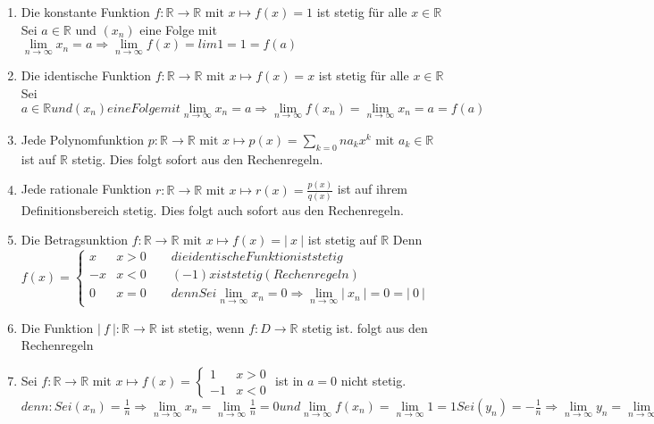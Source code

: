 \documentclass[a4paper,titlepage,oneside]{article}
\def\R{\ensuremath{\mathbb{R}} }
\renewcommand{\liminf}[2][n]{\ensuremath{\lim\limits_{#1 \rightarrow \infty}{#2}}}
\newcommand{\abs}[1]{\ensuremath{\left|\:#1\:\right|}}
\theoremstyle{thmstyle}
\begin{document}
\begin{bsp}
\begin{enumerate}
\item Die konstante Funktion $ f : \R \to \R \text{ mit } x \mapsto f(x) = 1 $ ist stetig für alle $x \in \R$
Sei $a \in \R$ und $(x_n)$ eine Folge mit $\liminf{x_n} = a \Rightarrow \liminf{f(x)} = lim 1 = 1 = f(a)$

\item Die identische Funktion $f : \R \to \R \text{ mit } x \mapsto f(x) = x $  ist stetig für alle $x \in \R$
Sei $a\in \R und (x_n) eine Folge mit \liminf{x_n} = a \Rightarrow \liminf{f(x_n)} = \liminf{x_n} = a = f(a)$

\item Jede Polynomfunktion $p : \R \to \R \text{ mit } x \mapsto p(x) = \sum_{k=0}{n}{a_kx^k} \text{ mit } a_k \in \R $ ist auf \R stetig.
Dies folgt sofort aus den Rechenregeln.

\item Jede rationale Funktion  $r : \R \to \R \text{ mit } x \mapsto r(x) = \frac{p(x)}{q(x)} $ ist auf ihrem Definitionsbereich stetig.
Dies folgt auch sofort aus den Rechenregeln.

\item Die Betragsunktion $f : \R \to \R \text{ mit } x \mapsto f(x) = \abs{x} $  ist stetig auf \R
Denn $f(x) = \begin{cases}
x & x > 0 \qquad die identische Funktion ist stetig \\
-x & x < 0 \qquad (-1)x ist stetig (Rechenregeln) \\
0 & x = 0 \qquad denn Sei \liminf{x_n} = 0 \Rightarrow \liminf{\abs{x_n}} = 0 = \abs{0}
\end{cases}$

\item Die Funktion $\abs{f} : \R \to \R $  ist stetig, wenn $ f: D \to \R $ stetig ist.
folgt aus den Rechenregeln

\item Sei $f : \R \to \R \text{ mit } x \mapsto f(x) = \begin{cases} 1 & x > 0 \\ -1 & x < 0\end{cases} $ ist in $a = 0$ nicht stetig. %
\begin{math}
denn: Sei (x_n) =  \frac{1}{n} \Rightarrow \liminf{x_n} = \liminf{\frac{1}{n}} = 0  und \liminf{f(x_n)} = \liminf{1} = 1
Sei (y_n) = - \frac{1}{n} \Rightarrow \liminf{y_n} = \liminf{-\frac{1}{n}} = 0  und \liminf{f(y_n)} = \liminf{-1} = -1
\Rightarrow f ist nicht stetig in a = 0
\end{math}


\end{enumerate}
\end{bsp}
\end{document}
